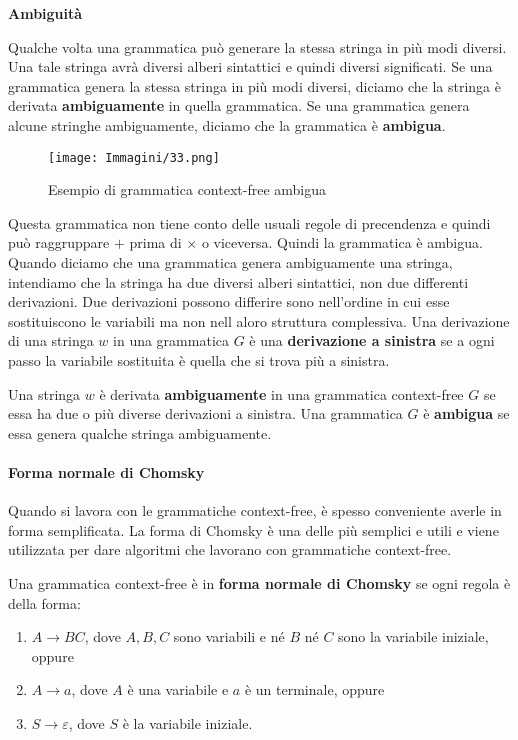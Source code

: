 \documentclass{article}
\begin{document}
\textbf{Ambiguità}

Qualche volta una grammatica può generare la stessa stringa in più modi diversi. Una tale stringa avrà diversi alberi sintattici e quindi diversi significati.
Se una grammatica genera la stessa stringa in più modi diversi, diciamo che la stringa è derivata \textbf{ambiguamente} in quella grammatica. Se una grammatica genera alcune stringhe ambiguamente, diciamo che la grammatica è \textbf{ambigua}.

\begin{figure}[H]
    \centering
    \texttt{[image: Immagini/33.png]}
    \caption{Esempio di grammatica context-free ambigua}
    \label{fig:ambiguous_grammar_example1}
\end{figure}
Questa grammatica non tiene conto delle usuali regole di precendenza e quindi può raggruppare $+$ prima di $\times$ o viceversa. Quindi la grammatica è ambigua.
Quando diciamo che una grammatica genera ambiguamente una stringa, intendiamo che la stringa ha due diversi alberi sintattici, non due differenti derivazioni.
Due derivazioni possono differire sono nell'ordine in cui esse sostituiscono le variabili ma non nell aloro struttura complessiva.
Una derivazione di una stringa $w$ in una grammatica $G$ è una \textbf{derivazione a sinistra} se a ogni passo la variabile sostituita è quella che si trova più a sinistra.
\vspace{1em}

\begin{tcolorbox}[colback=blue!10!white, colframe=blue!50!black, title=Definizione 2.7]
    Una stringa $w$ è derivata \textbf{ambiguamente} in una grammatica context-free $G$ se essa ha due o più diverse derivazioni a sinistra. Una grammatica $G$ è \textbf{ambigua} se essa genera qualche stringa ambiguamente.
\end{tcolorbox}

\newpage
\paragraph{Forma normale di Chomsky}
\label{Forma normale di Chomsky}
\text{ }

Quando si lavora con le grammatiche context-free, è spesso conveniente averle in forma semplificata. La forma di Chomsky è una delle più semplici e utili e viene utilizzata per dare algoritmi che lavorano con grammatiche context-free.

\begin{tcolorbox}[colback=blue!10!white, colframe=blue!50!black, title=Forma Normale di Chomsky]
    Una grammatica context-free è in \textbf{forma normale di Chomsky} se ogni regola è della forma:
    \begin{enumerate}
        \item $A \rightarrow BC$, dove $A, B, C$ sono variabili e né $B$ né $C$ sono la variabile iniziale, oppure
        \item $A \rightarrow a$, dove $A$ è una variabile e $a$ è un terminale, oppure
        \item $S \rightarrow \varepsilon$, dove $S$ è la variabile iniziale.
    \end{enumerate}
\end{tcolorbox}
\end{document}
